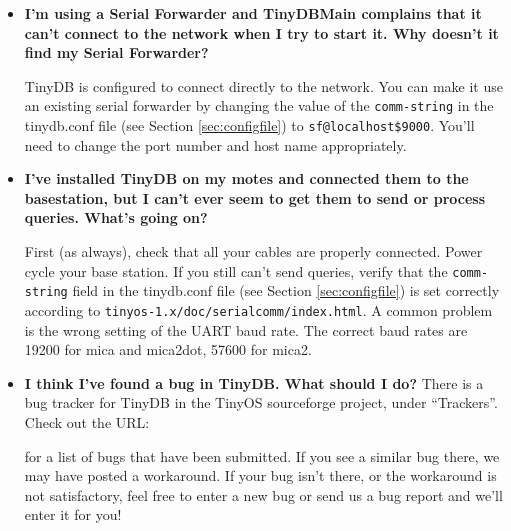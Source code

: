 \documentclass[11pt]{article}
\newcommand{\docroot}{tinyos-1.x}
\begin{document}
\begin{itemize}
\item{\bf I'm using a Serial Forwarder and TinyDBMain complains that it can't connect to the network
        when I try to start it.  Why doesn't it find my Serial Forwarder?}

TinyDB is configured to connect directly to the network.  You can make it use an
existing serial forwarder by changing the value of the {\tt comm-string} in the tinydb.conf
file (see Section \ref{sec:configfile}) to {\tt sf@localhost\$9000}.  You'll need to change
the port number and host name appropriately.

\item{\bf I've installed TinyDB on my motes and connected them to the basestation, but I can't ever seem
        to get them to send or process queries.  What's going on?}

First (as always), check that all your cables are properly connected.  Power cycle your base station.
If you still can't send queries, verify that the {\tt comm-string}  
field in the tinydb.conf file (see Section \ref{sec:configfile}) 
is set correctly according to {\tt \docroot/doc/serialcomm/index.html}.
A common problem is the wrong setting of the UART baud rate.
The correct baud rates are 19200 for mica and mica2dot,
57600 for mica2.

%

\item{\bf I think I've found a bug in TinyDB. What should I do?}
There is a bug tracker for TinyDB in the TinyOS sourceforge project, under ``Trackers''.
Check out the URL:


for a list of bugs that have
been submitted.  If you see a similar bug there, we may have posted a workaround.  If your bug isn't
there, or the workaround is not satisfactory, feel free to enter a new bug or send us a bug report and
we'll enter it for you!

\end{itemize}
\end{document}

